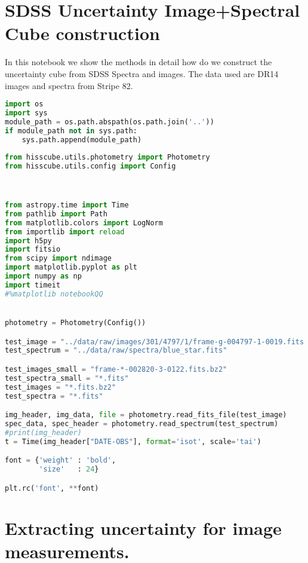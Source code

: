 \section{SDSS Uncertainty Image+Spectral Cube
construction}\label{sdss-uncertainty-imagespectral-cube-construction}

In this notebook we show the methods in detail how do we construct the
uncertainty cube from SDSS Spectra and images. The data used are DR14
images and spectra from Stripe 82.

\begin{lstlisting}[language=Python]
import os
import sys
module_path = os.path.abspath(os.path.join('..'))
if module_path not in sys.path:
    sys.path.append(module_path)
    
from hisscube.utils.photometry import Photometry
from hisscube.utils.config import Config



from astropy.time import Time
from pathlib import Path
from matplotlib.colors import LogNorm
from importlib import reload
import h5py
import fitsio
from scipy import ndimage
import matplotlib.pyplot as plt
import numpy as np
import timeit
#%matplotlib notebookQQ


photometry = Photometry(Config())

test_image = "../data/raw/images/301/4797/1/frame-g-004797-1-0019.fits.bz2"    
test_spectrum = "../data/raw/spectra/blue_star.fits"

test_images_small = "frame-*-002820-3-0122.fits.bz2"
test_spectra_small = "*.fits"
test_images = "*.fits.bz2"
test_spectra = "*.fits"

img_header, img_data, file = photometry.read_fits_file(test_image)
spec_data, spec_header = photometry.read_spectrum(test_spectrum)
#print(img_header)
t = Time(img_header["DATE-OBS"], format='isot', scale='tai')

font = {'weight' : 'bold',
        'size'   : 24}

plt.rc('font', **font)
\end{lstlisting}

\section{Extracting uncertainty for image
measurements.}\label{extracting-uncertainty-for-image-measurements.}

